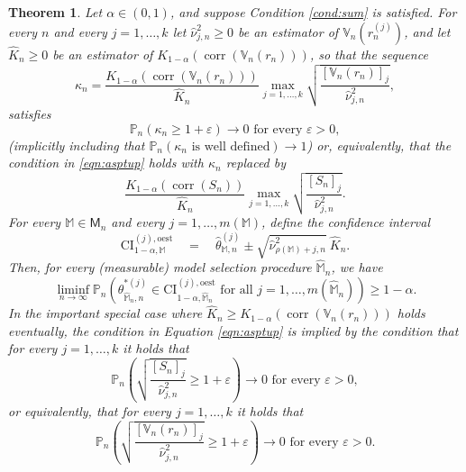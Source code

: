 \documentclass[preprint]{imsart}
\newcommand{\eps}{\varepsilon}
\newcommand{\M}{\mathbb M}
\DeclareMathOperator{\corr}{corr}
\newtheorem{theorem}{Theorem}[section]
\numberwithin{equation}{section}
\begin{document}
\begin{theorem}\label{thm:cons}
Let $\alpha \in (0, 1)$, and suppose Condition \ref{cond:sum} is satisfied. For every $n$ and every $j = 1, \hdots, k$ let $\hat{\nu}^2_{j,n} \geq 0$ be an estimator of $\mathbb{V}_n(r_n^{(j)})$, and let $\hat{K}_n \geq 0$ be an estimator of $K_{1-\alpha}(\corr(\mathbb{V}_n(r_n)))$, so that the sequence
%
\begin{equation*}
\kappa_n = \frac{K_{1-\alpha}(\corr(\mathbb{V}_n(r_n)))}{\hat{K}_n} \max_{j = 1, \hdots, k} \sqrt{\frac{[\mathbb{V}_n(r_n)]_{j} }{  \hat{\nu}^2_{j,n} }},
\end{equation*}
%
satisfies
%
\begin{equation}\label{eqn:asptup}
\mathbb{P}_n \left( \kappa_n \geq 1+ \eps \right) \to 0 \text{ for every } \eps > 0,
\end{equation}
%
(implicitly including that $\mathbb{P}_n(\kappa_n \text{ is well defined} ) \to 1$) or, equivalently, that the condition in \eqref{eqn:asptup} holds with $\kappa_n$ replaced by
%
\begin{equation*}
\frac{K_{1-\alpha}(\corr(S_n))}{\hat{K}_n} \max_{j = 1, \hdots, k} \sqrt{\frac{[S_n]_{j} }{  \hat{\nu}^2_{j,n} }}.
\end{equation*}
%
For every $\mathbb{M} \in \mathsf{M}_n$ and every $j = 1, \hdots, m(\mathbb{M})$, define the confidence interval
%
\begin{equation*}
\mathrm{CI}_{1 - \alpha, \mathbb{M}}^{(j), \mathrm{oest}} \quad = \quad \hat{\theta}^{(j)}_{\mathbb{M}, n} \pm \sqrt{\hat{\nu}^2_{\rho(\M) + j, n}} ~  \hat{K}_n.
\end{equation*}
%
Then, for every (measurable) model selection procedure $\hat{\mathbb{M}}_n$, we have
%
\begin{equation*}
\liminf_{n \to \infty} \mathbb{P}_n \left( \theta_{\hat{\mathbb{M}}_n, n}^{*(j)} \in \mathrm{CI}_{1 - \alpha, \hat{\mathbb{M}}_n}^{(j), \mathrm{oest}} \text{ for all } j = 1, \hdots, m(\hat{\mathbb{M}}_n)  \right) \geq 1-\alpha.
\end{equation*}
%
In the important special case where $\hat{K}_n \geq K_{1-\alpha}(\corr(\mathbb{V}_n(r_n)))$ holds eventually,  the condition in Equation \eqref{eqn:asptup} is implied by the condition that for every $j = 1, \hdots, k$ it holds that
%
\begin{equation}\label{eqn:special1}
\mathbb{P}_n \left( \sqrt{\frac{[S_n]_{j} }{  \hat{\nu}^2_{j,n} }} \geq 1+ \eps \right) \to 0 \text{ for every } \eps > 0,
\end{equation}
%
or equivalently, that for every $j = 1, \hdots, k$ it holds that
%
\begin{equation}\label{eqn:special2}
\mathbb{P}_n \left( \sqrt{\frac{[\mathbb{V}_n(r_n)]_{j} }{  \hat{\nu}^2_{j,n} }} \geq 1+ \eps \right) \to 0 \text{ for every } \eps > 0.
\end{equation}
%
\end{theorem}
\end{document}
